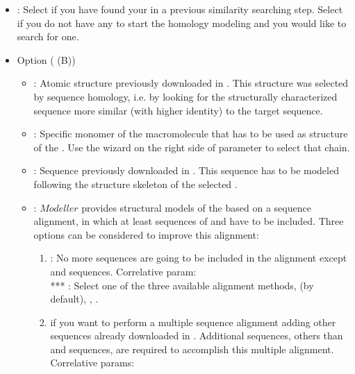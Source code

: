 \begin{itemize}
\begin{itemize}
                        \begin{itemize}
                        \item {}: Select  if you have found your  in a previous similarity searching step. Select  if you do not have any  to start the homology modeling and you would like to search for one.
                        \item Option  ( (B))
                                        \begin{itemize}
                                                \item {}: Atomic structure previously downloaded in \scipion. This structure was selected by sequence homology, i.e. by looking for the structurally characterized sequence more similar (with higher identity) to the target sequence.
                                                \item {}: Specific monomer of the macromolecule that has to be used as structure  of the . Use the wizard on the right side of  parameter to select that chain.
                                                \item {}: Sequence previously downloaded in \scipion. This sequence has to be modeled following the structure skeleton of the selected .
                                                \item {}: $Modeller$ provides structural models of the  based on a sequence alignment, in which at least sequences of  and  have to be included. Three options can be considered to improve this alignment:
                                                \begin{enumerate}
                                                \item {}: No more sequences are going to be included in the alignment except  and  sequences. Correlative param:\\
                                                     *** : Select one of the three available alignment methods,  (by default), , .
                                                \item {} if you want to perform a multiple sequence alignment adding other sequences already downloaded in \scipion. Additional sequences, others than  and  sequences, are required to accomplish this multiple alignment. Correlative params:\\

\end{enumerate}
\end{itemize}
\end{itemize}
\end{itemize}
\end{itemize}
